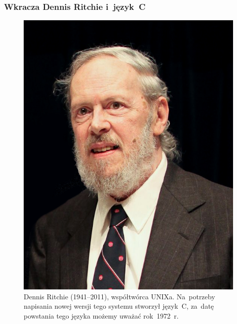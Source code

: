 \documentclass[10pt,t]{beamer}
\begin{document}
\begin{frame}
  \frametitle{Wkracza Dennis Ritchie i~język~C}


  \begin{figure}

    \centering


    \includegraphics[scale=0.225]
    {./PresentationsPictures/OS-heroes-Pictures/Dennis-Ritchie.jpeg}

    \caption{Dennis Ritchie (1941--2011), współtwórca UNIXa. Na~potrzeby
      napisania nowej wersji tego systemu stworzył język~C, za~datę
      powstania tego języka możemy uważać rok~1972~r.}

    \label{fig:Dennis-Ritchie}

  \end{figure}

\end{frame}
\end{document}

